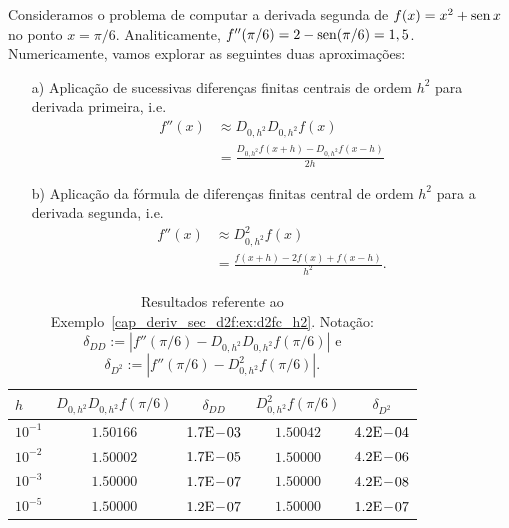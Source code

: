 \begin{ex}\label{cap_deriv_sec_d2f:ex:d2fc_h2}
  Consideramos o problema de computar a derivada segunda de $f(x) = x^2 + \operatorname{sen} x$ no ponto $x=\pi/6$. Analiticamente, $f''(\pi/6) = 2 - \operatorname{sen}(\pi/6) = 1,5$. Numericamente, vamos explorar as seguintes duas aproximações:
  \begin{enumerate}
  \item[a)] Aplicação de sucessivas diferenças finitas centrais de ordem $h^2$ para derivada primeira, i.e.
    \begin{subequations}\label{cap_deriv_sec_d2f:eq:ddf}
      \begin{align}
        f''(x) &\approx D_{0,h^2}D_{0,h^2}f(x) \\
               &= \frac{D_{0,h^2}f(x+h) - D_{0,h^2}f(x-h)}{2h}
      \end{align}
    \end{subequations}
  \item[b)] Aplicação da fórmula de diferenças finitas central de ordem $h^2$ para a derivada segunda, i.e.
    \begin{subequations}
      \begin{align}
        f''(x) &\approx D_{0,h^2}^2 f(x)\\
               &= \frac{f(x+h) - 2f(x) + f(x-h)}{h^2}.
      \end{align}
    \end{subequations}
  \end{enumerate}

\begin{table}[h!]
  \centering
  \caption{Resultados referente ao Exemplo~\ref{cap_deriv_sec_d2f:ex:d2fc_h2}. Notação: $\delta_{DD}:=|f''(\pi/6)-D_{0,h^2}D_{0,h^2}f(\pi/6)|$ e $\delta_{D^2}:=|f''(\pi/6)-D^2_{0,h^2}f(\pi/6)|$.}
  \begin{tabular}{l|cc|cc}
    $h$ & $D_{0,h^2}D_{0,h^2}f(\pi/6)$ & $\delta_{DD}$ & $D^2_{0,h^2}f(\pi/6)$ & $\delta_{D^2}$ \\ \hline
    $10^{-1}$ &  $1.50166$ & $1.7\mathrm{E}\!-\!03$ & $1.50042$ & $4.2\mathrm{E}\!-\!04$ \\
    $10^{-2}$ &  $1.50002$ & $1.7\mathrm{E}\!-\!05$ & $1.50000$ & $4.2\mathrm{E}\!-\!06$ \\
    $10^{-3}$ &  $1.50000$ & $1.7\mathrm{E}\!-\!07$ & $1.50000$ & $4.2\mathrm{E}\!-\!08$ \\
    $10^{-5}$ &  $1.50000$ & $1.2\mathrm{E}\!-\!07$ & $1.50000$ & $1.2\mathrm{E}\!-\!07$ \\\hline
  \end{tabular}
  \label{cap_deriv_sec_d2f:tab:ex_d2fc_h2}
\end{table}


\end{ex}
